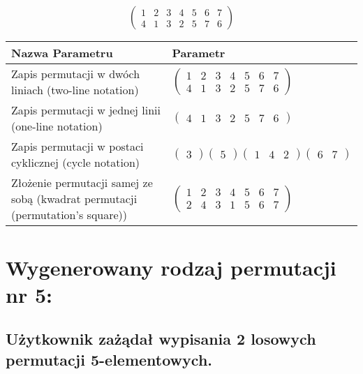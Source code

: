 \documentclass[12pt]{article}
\begin{document}
\subsection{}
\begin{center}
\[
\begin{pmatrix}
	1 & 2 & 3 & 4 & 5 & 6 & 7 \\ 
	4 & 1 & 3 & 2 & 5 & 7 & 6 
\end{pmatrix}
\]

\begin{tabular}{|m{0.6\linewidth}|m{0.4\linewidth}|}
	\hline
	Nazwa Parametru & Parametr \\
	\hline
	Zapis permutacji w dwóch liniach (two-line notation) & $\begin{pmatrix} 1 & 2 & 3 & 4 & 5 & 6 & 7 \\ 
4 & 1 & 3 & 2 & 5 & 7 & 6 \end{pmatrix}$ \\ 
	\hline
	Zapis permutacji w jednej linii (one-line notation) & $\begin{pmatrix} 4 & 1 & 3 & 2 & 5 & 7 & 6 \end{pmatrix}$ \\ 
	\hline
	Zapis permutacji w postaci cyklicznej (cycle notation) & $\begin{pmatrix} 3 \end{pmatrix} \begin{pmatrix} 5 \end{pmatrix} \begin{pmatrix} 1 & 4 & 2 \end{pmatrix} \begin{pmatrix} 6 & 7 \end{pmatrix} $ \\ 
	\hline
	Złożenie permutacji samej ze sobą (kwadrat permutacji (permutation's square)) & $\begin{pmatrix} 1 & 2 & 3 & 4 & 5 & 6 & 7 \\ 
2 & 4 & 3 & 1 & 5 & 6 & 7 \end{pmatrix}$ \\ 
	\hline
\end{tabular}
\end{center}


\section{Wygenerowany rodzaj permutacji nr 5:}
\subsection*{Użytkownik zażądał wypisania 2 losowych permutacji 5-elementowych.}
\end{document}

